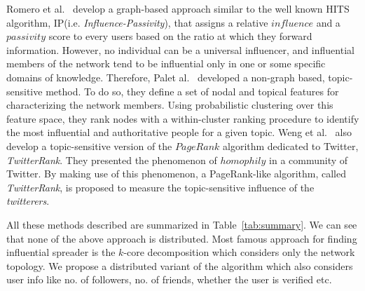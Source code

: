 \documentclass[sigconf]{acmart}
\begin{document}
Romero et al.~\cite{romero2011influence} develop a graph-based approach similar to the well known HITS algorithm, IP(i.e. \emph{Influence-Passivity}), that assigns a relative $influence$ and a $passivity$ score to every users based on the ratio at which they forward information. However, no individual can be a universal influencer, and influential members of the network tend to be influential only in one or some specific domains of knowledge. Therefore, Palet al.~\cite{pal2011identifying} developed a non-graph based, topic-sensitive method. To do so, they define a set of nodal and topical features for characterizing the network members. Using probabilistic clustering over this feature space, they rank nodes with a within-cluster ranking procedure to identify the most influential and authoritative people for a given topic. Weng et al.~\cite{weng2010twitterrank} also develop a topic-sensitive version of the $PageRank$ algorithm dedicated to Twitter, \emph{TwitterRank}. They presented the phenomenon of $homophily$ in a community of Twitter. By making use of this phenomenon, a PageRank-like algorithm, called \emph{TwitterRank}, is proposed to measure the topic-sensitive influence of the \emph{twitterers}. 

All these methods described are summarized in Table~\ref{tab:summary}. We can see that none of the above approach is distributed. Most famous approach for finding influential spreader is the $k$-core decomposition which considers only the network topology. We propose a distributed variant of the algorithm which also considers user info like no. of followers, no. of friends, whether the user is verified etc.
\end{document}
